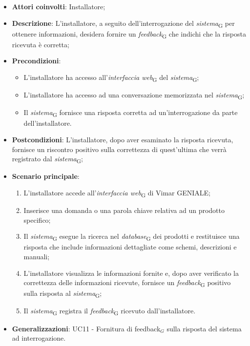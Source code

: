 \begin{itemize}
    \item \textbf{Attori coinvolti}: Installatore;
    \item \textbf{Descrizione}: L’installatore, a seguito dell’interrogazione del \textit{sistema}\textsubscript{G} per ottenere informazioni, desidera fornire un \textit{feedback}\textsubscript{G} che indichi che la risposta ricevuta è corretta;
    \item \textbf{Precondizioni}: 
        \begin{itemize}
            \item L’installatore ha accesso all’\textit{interfaccia web}\textsubscript{G} del \textit{sistema}\textsubscript{G};
            \item L’installatore ha accesso ad una conversazione memorizzata nel \textit{sistema}\textsubscript{G};
            \item Il \textit{sistema}\textsubscript{G} fornisce una risposta corretta ad un’interrogazione da parte dell’installatore.
        \end{itemize}
    \item \textbf{Postcondizioni}: L’installatore, dopo aver esaminato la risposta ricevuta, fornisce un riscontro positivo sulla correttezza di quest’ultima che verrà registrato dal \textit{sistema}\textsubscript{G};
    \item \textbf{Scenario principale}:
    \begin{enumerate}
    \item L’installatore accede all’\textit{interfaccia web}\textsubscript{G} di Vimar GENIALE;
    \item Inserisce una domanda o una parola chiave relativa ad un prodotto specifico;
    \item Il \textit{sistema}\textsubscript{G} esegue la ricerca nel \textit{database}\textsubscript{G} dei prodotti e restituisce una risposta che include informazioni dettagliate come schemi, descrizioni e manuali;
    \item L’installatore visualizza le informazioni fornite e, dopo aver verificato la correttezza delle informazioni ricevute, fornisce un \textit{feedback}\textsubscript{G} positivo sulla risposta al \textit{sistema}\textsubscript{G};
    \item Il \textit{sistema}\textsubscript{G} registra il \textit{feedback}\textsubscript{G} ricevuto dall’installatore.
    \end{enumerate}
    \item \textbf{Generalizzazioni}: UC11 - Fornitura di feedback$_G$ sulla risposta del sistema ad interrogazione.
\end{itemize}

